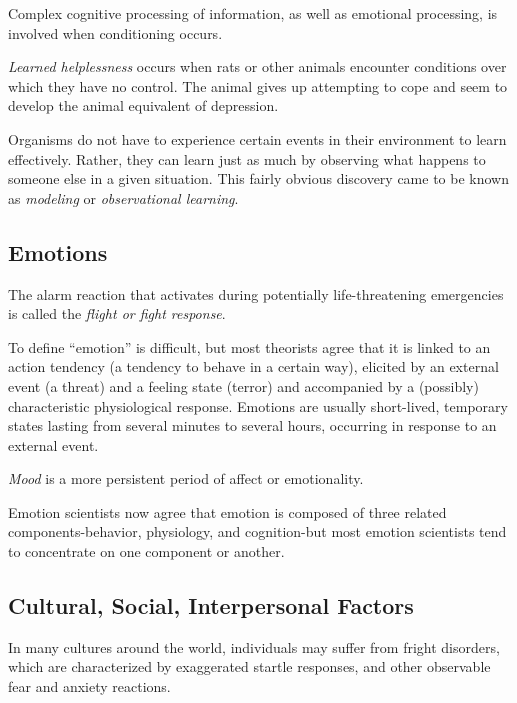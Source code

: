 Complex cognitive processing of information, as well as emotional processing, is involved when conditioning occurs.

\begin{definition}\label{def:Learned_Helplessness}
  \emph{Learned helplessness} occurs when rats or other animals encounter conditions over which they have no control.
  The animal gives up attempting to cope and seem to develop the animal equivalent of depression.
\end{definition}

Organisms do not have to experience certain events in their environment to learn effectively.
Rather, they can learn just as much by observing what happens to someone else in a given situation.
This fairly obvious discovery came to be known as \emph{modeling} or \emph{observational learning}.

\subsection{Emotions}\label{subsec:Emotions}
The alarm reaction that activates during potentially life-threatening emergencies is called the \emph{flight or fight response}.

To define ``emotion'' is difficult, but most theorists agree that it is linked to an action tendency (a tendency to behave in a certain way), elicited by an external event (a threat) and a feeling state (terror) and accompanied by a (possibly) characteristic physiological response.
Emotions are usually short-lived, temporary states lasting from several minutes to several hours, occurring in response to an external event.

\begin{definition}[Mood]\label{def:Mood}
  \emph{Mood} is a more persistent period of affect or emotionality.
\end{definition}


Emotion scientists now agree that emotion is composed of three related components-behavior, physiology, and cognition-but most emotion scientists tend to concentrate on one component or another.

\subsection{Cultural, Social, Interpersonal Factors}\label{subsec:Cultural_Social_Interpersonal_Factors}
In many cultures around the world, individuals may suffer from fright disorders, which are characterized by exaggerated startle responses, and other observable fear and anxiety reactions.

